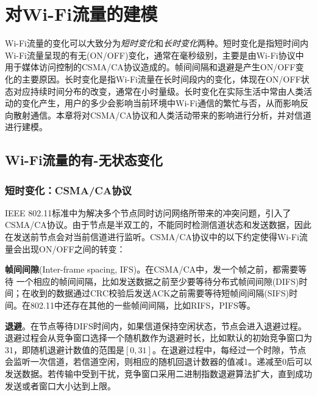 
\chapter{对Wi-Fi流量的建模}
\label{chap:model}
Wi-Fi流量的变化可以大致分为\emph{短时变化}和\emph{长时变化}两种。短时变化是指短时间内Wi-Fi流量呈现的有无(ON/OFF)变化，通常在毫秒级别，主要是由Wi-Fi协议中用于媒体访问控制的CSMA/CA协议造成的。帧间间隔和退避是产生ON/OFF变化的主要原因。长时变化是指Wi-Fi流量在长时间段内的变化，体现在ON/OFF状态对应持续时间分布的改变，通常在小时量级。长时变化在实际生活中常由人类活动的变化产生，用户的多少会影响当前环境中Wi-Fi通信的繁忙与否，从而影响反向散射通信。本章将对CSMA/CA协议和人类活动带来的影响进行分析，并对信道进行建模。
\section{Wi-Fi流量的有-无状态变化}
\subsection{短时变化：CSMA/CA协议}
IEEE 802.11标准中为解决多个节点同时访问网络所带来的冲突问题，引入了CSMA/CA协议。由于节点是半双工的，不能同时检测信道状态和发送数据，因此在发送前节点会对当前信道进行监听。CSMA/CA协议中的以下约定使得Wi-Fi流量会出现ON/OFF之间的转变：

\textbf{帧间间隙}(Inter-frame spacing, IFS)。在CSMA/CA中，发一个帧之前，都需要等待 一个相应的帧间间隔，比如发送数据之前至少要等待分布式帧间间隙(DIFS)时间；在收到的数据通过CRC校验后发送ACK之前需要等待短帧间间隔(SIFS)时间。在802.11中还存在其他的一些帧间间隔，比如RIFS，PIFS等。

\textbf{退避}。在节点等待DIFS时间内，如果信道保持空闲状态，节点会进入退避过程。退避过程会从竞争窗口选择一个随机数作为退避时长，比如默认的初始竞争窗口为31，即随机退避计数值的范围是$[0,31]$。在退避过程中，每经过一个时隙，节点会监听一次信道，若信道空闲，则相应的随机回退计数器的值减1。递减至0后可以发送数据。若传输中受到干扰，竞争窗口采用二进制指数退避算法扩大，直到成功发送或者窗口大小达到上限。

